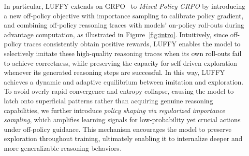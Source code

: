 \documentclass{article}
\begin{document}
In particular, LUFFY extends on GRPO~\cite{grpo} to \textit{Mixed-Policy GRPO} by introducing a new off-policy objective with importance sampling to calibrate policy gradient, and combining off-policy reasoning traces with models' on-policy roll-outs during advantage computation, as illustrated in Figure~\ref{fig:intro}. 
Intuitively, since off-policy traces consistently obtain positive rewards, LUFFY enables the model to selectively imitate these high-quality reasoning traces when its own roll-outs fail to achieve correctness, while preserving the capacity for self-driven exploration whenever its generated reasoning steps are successful. 
In this way, LUFFY achieves a dynamic and adaptive equilibrium between imitation and exploration. 
To avoid overly rapid convergence and entropy collapse, causing the model to latch onto superficial patterns rather than acquiring genuine reasoning capabilities, we further introduce \textit{policy shaping via regularized importance sampling}, which amplifies learning signals for low-probability yet crucial actions under off-policy guidance. 
This mechanism encourages the model to preserve exploration throughout training, ultimately enabling it to internalize deeper and more generalizable reasoning behaviors.


\end{document}
